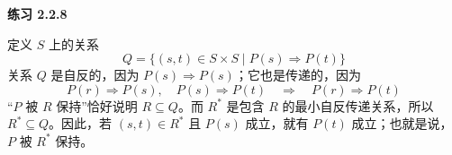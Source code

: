 \begin{taplsolutionentrybox}
\label{sol:translator:2.2.8}
\textbf{练习 2.2.8}

定义 \(S\) 上的关系
\[
  Q=\{(s,t)\in S\times S\mid P(s)\Rightarrow P(t)\}
\]
关系 \(Q\) 是自反的，因为 \(P(s)\Rightarrow P(s)\)；它也是传递的，因为
\[
  P(r)\Rightarrow P(s),\quad P(s)\Rightarrow P(t)
  \quad\Longrightarrow\quad
  P(r)\Rightarrow P(t)
\]
“\(P\) 被 \(R\) 保持”恰好说明 \(R\subseteq Q\)。而 \(R^*\) 是包含
\(R\) 的最小自反传递关系，所以 \(R^*\subseteq Q\)。因此，若
\((s,t)\in R^*\) 且 \(P(s)\) 成立，就有 \(P(t)\) 成立；也就是说，
\(P\) 被 \(R^*\) 保持。

\end{taplsolutionentrybox}
